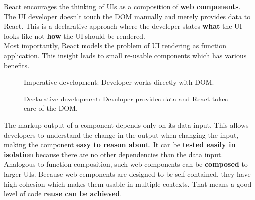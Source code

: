 React encourages the thinking of UIs as a composition of \textbf{web components}. The UI developer doesn't touch the DOM manually and merely provides data to React. This is a declarative approach where the developer states \textbf{what} the UI looks like not \textbf{how} the UI should be rendered. \\
Most importantly, React models the problem of UI rendering as function application. This insight leads to small re-usable components which has various benefits.

\begin{figure}[!htb]
  \caption{Imperative development: Developer works directly with DOM.}
\end{figure}

\begin{figure}[!htb]
  \caption{Declarative development: Developer provides data and React takes care of the DOM.}
\end{figure}

The markup output of a component depends only on its data input. This allows developers to understand the change in the output when changing the input, making the component \textbf{easy to reason about}. It can be \textbf{tested easily in isolation} because there are no other dependencies than the data input. Analogous to function composition, such web components can be \textbf{composed} to larger UIs. Because web components are designed to be self-contained, they have high cohesion which makes them usable in multiple contexts. That means a good level of code \textbf{reuse can be achieved}.

